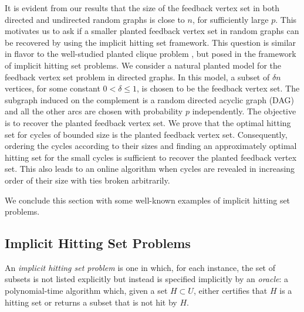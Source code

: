 \documentclass[11pt]{article}
\begin{document}
It is evident from our results that the size of the feedback vertex set in both directed and undirected random graphs is close to $n$, for sufficiently large $p$. This motivates us to ask if a smaller planted feedback vertex set in random graphs can be recovered by using the implicit hitting set framework. This question is similar in flavor to the well-studied planted clique problem \cite{jerrumClique92,sudakov98,frieze08}, but posed in the framework of implicit hitting set problems. We consider a natural planted model for the feedback vertex set problem in directed graphs. In this model, a subset of $\delta n$ vertices, for some constant $0<\delta\leq 1$, is chosen to be the feedback vertex set. The subgraph induced on the complement is a random directed acyclic graph (DAG) and all the other arcs are chosen with probability $p$ independently. The objective is to recover the planted feedback vertex set. We prove that the optimal hitting set for cycles of bounded size is the planted feedback vertex set. Consequently, ordering the cycles according to their sizes and finding an approximately optimal hitting set for the small cycles is sufficient to recover the planted feedback vertex set. This also leads to an online algorithm when cycles are revealed in increasing order of their size with ties broken arbitrarily.


We conclude this section with some well-known examples of implicit hitting set problems.

\subsection{Implicit Hitting Set Problems}


An {\it implicit hitting set problem} is one in which, for each instance, the
set of subsets is not listed explicitly but instead is specified implicitly by
an {\it oracle}: a polynomial-time algorithm which, given a set $H \subset U$,
either certifies that $H$ is a hitting set or returns a subset that is not hit
by $H$.
\end{document}
